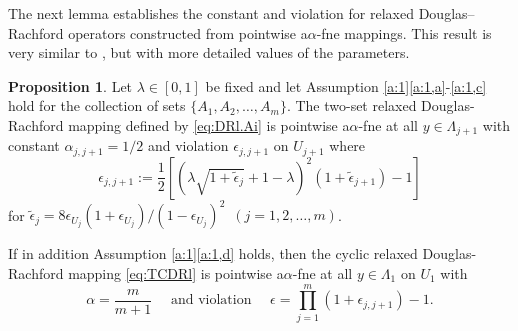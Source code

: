 \documentclass[12pt]{article}
\theoremstyle{definition}
\newtheorem{proposition}{Proposition}
\newcommand{\Id}{\mathrm{Id}}
\begin{document}
The next lemma establishes the constant and violation for relaxed Douglas--Rachford operators constructed from
pointwise a$\alpha$-fne mappings.  This result is very similar to \cite[Theorem 3.7]{luke2020convergence}, but with
more detailed values of the parameters.
\begin{proposition}\label{lem:Tfirmly.nonep}
Let $\lambda\in [0,1]$ be fixed and let Assumption \ref{a:1}\eqref{a:1,a}-\eqref{a:1,c} hold
for the collection of sets $\{A_1, A_2, \dots, A_m\}$.
The two-set relaxed Douglas-Rachford mapping defined by \eqref{eq:DRl.Ai}
is pointwise a$\alpha$-fne at all $y\in \Lambda_{j+1}$ with constant $\alpha_{j,j+1}=1/2$ and
violation $\epsilon_{j,j+1}$ on $U_{j+1}$
where
\begin{equation}
    \epsilon_{j,j+1}:=\frac{1}{2}\left[\left(\lambda\sqrt{1+\tilde\epsilon_{j}}+1-\lambda\right)^2(1+\tilde\epsilon_{j+1})-1\right]
\end{equation}
for
$\tilde{\epsilon}_j= 8\epsilon_{U_j}(1 + \epsilon_{U_j})/(1 -\epsilon_{U_j})^2$ \,$(j=1,2,\dots, m)$.

If in addition Assumption \ref{a:1}\eqref{a:1,d} holds, then the cyclic relaxed Douglas-Rachford mapping
\eqref{eq:TCDRl} is pointwise
a$\alpha$-fne at all $y\in \Lambda_1$ on $U_1$ with
\begin{equation}\label{eq:violation.composite}
 \alpha = \frac{m}{m+1}
\quad\mbox{ and violation }\quad
    \epsilon=\prod_{j=1}^m(1+\epsilon_{j,j+1})-1.
\end{equation}
\end{proposition}
\end{document}
